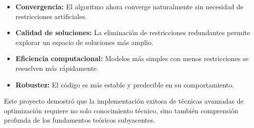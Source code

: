 \documentclass[a4paper,12pt]{article}
\begin{document}
\begin{itemize}
    \item \textbf{Convergencia:} El algoritmo ahora converge naturalmente sin necesidad de restricciones artificiales.
    \item \textbf{Calidad de soluciones:} La eliminación de restricciones redundantes permite explorar un espacio de soluciones más amplio.
    \item \textbf{Eficiencia computacional:} Modelos más simples con menos restricciones se resuelven más rápidamente.
    \item \textbf{Robustez:} El código es más estable y predecible en su comportamiento.
\end{itemize}

Este proyecto demostró que la implementación exitosa de técnicas avanzadas de optimización requiere no solo conocimiento técnico, sino también comprensión profunda de los fundamentos teóricos subyacentes.
\end{document}
